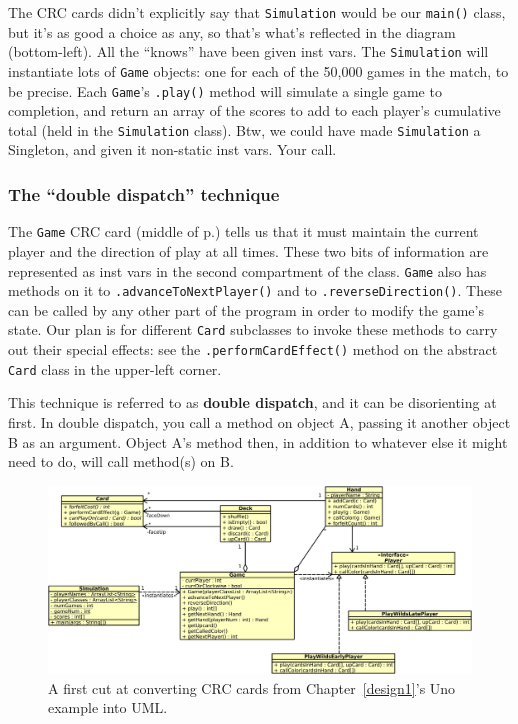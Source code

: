 The CRC cards didn't explicitly say that \texttt{Simulation} would be our
\texttt{main()} class, but it's as good a choice as any, so that's what's
reflected in the diagram (bottom-left). All the ``knows'' have been given inst
vars. The \texttt{Simulation} will instantiate lots of \texttt{Game} objects:
one for each of the 50,000 games in the match, to be precise. Each
\texttt{Game}'s \texttt{.play()} method will simulate a single game to
completion, and return an array of the scores to add to each player's
cumulative total (held in the \texttt{Simulation} class). Btw,
we could have made \texttt{Simulation} a Singleton, and given it non-static
inst vars. Your call.

\subsubsection{The ``double dispatch'' technique}

The \texttt{Game} CRC card (middle of p.\pageref{unoCRC2}) tells us that it
must maintain the current player and the direction of play at all times. These
two bits of information are represented as inst vars in the second compartment
of the class. \texttt{Game} also has methods on it to
\texttt{.advanceToNextPlayer()} and to \texttt{.reverseDirection()}. These can
be called by any other part of the program in order to modify the game's state.
Our plan is for different \texttt{Card} subclasses to invoke these methods to
carry out their special effects: see the \texttt{.performCardEffect()} method
on the abstract \texttt{Card} class in the upper-left corner.

This technique is referred to as \textbf{double dispatch}, and it can be
disorienting at first. In double dispatch, you call a method on object A,
passing it another object B as an argument. Object A's method then, in addition
to whatever else it might need to do, will call method(s) on B.

\begin{figure}[ht]
\centering
\includegraphics[width=1\textwidth]{UnoClassDiagram.png}
\medskip
\caption{A first cut at converting CRC cards from Chapter~\ref{design1}'s
Uno example into UML.}
\label{fig:unoClassDiag}
\end{figure}


